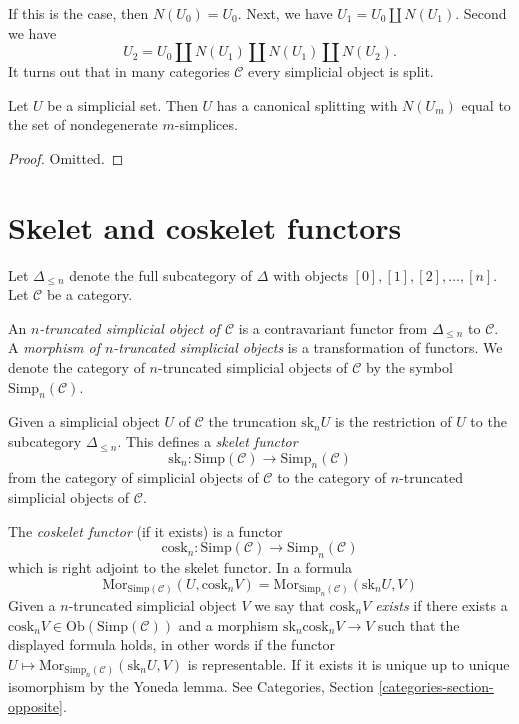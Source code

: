 \noindent
If this is the case, then $N(U_0) = U_0$. Next, we have
$U_1 = U_0 \coprod N(U_1)$. Second we have
$$
U_2 = U_0 \coprod N(U_1) \coprod N(U_1) \coprod N(U_2).
$$
It turns out that in many categories $\mathcal{C}$
every simplicial object is split.

\begin{lemma}
\label{lemma-splitting-simplicial-sets}
Let $U$ be a simplicial set.
Then $U$ has a canonical splitting
with $N(U_m)$ equal to the set of 
nondegenerate $m$-simplices.
\end{lemma}

\begin{proof}
Omitted.
\end{proof}

\section{Skelet and coskelet functors}
\label{section-skelet}

\noindent
Let $\Delta_{\leq n}$ denote the full subcategory of
$\Delta$ with objects $[0], [1], [2], \ldots, [n]$.
Let $\mathcal{C}$ be a category.

\begin{definition}
\label{definition-truncated-simplicial-object}
An {\it $n$-truncated simplicial object of $\mathcal{C}$} 
is a contravariant functor from $\Delta_{\leq n}$ to
$\mathcal{C}$. A {\it morphism of $n$-truncated
simplicial objects} is a transformation of functors.
We denote the category of $n$-truncated
simplicial objects of $\mathcal{C}$ by
the symbol $\text{Simp}_n(\mathcal{C})$.
\end{definition}

\noindent
Given a simplicial object $U$ of $\mathcal{C}$
the truncation $\text{sk}_n U$ is the restriction
of $U$ to the subcategory $\Delta_{\leq n}$.
This defines a {\it skelet functor}
$$
\text{sk}_n :
\text{Simp}(\mathcal{C}) \longrightarrow \text{Simp}_n(\mathcal{C})
$$
from the category of simplicial objects of $\mathcal{C}$
to the category of $n$-truncated simplicial objects of $\mathcal{C}$.

\medskip\noindent
The {\it coskelet functor} (if it exists) is a functor
$$
\text{cosk}_n :
\text{Simp}(\mathcal{C}) \longrightarrow \text{Simp}_n(\mathcal{C})
$$
which is right adjoint to the skelet functor. In a formula
\begin{equation}
\label{equation-cosk}
\text{Mor}_{\text{Simp}(\mathcal{C})}(U, \text{cosk}_n V)
=
\text{Mor}_{\text{Simp}_n(\mathcal{C})}(\text{sk}_n U, V)
\end{equation}
Given a $n$-truncated simplicial object $V$ we 
say that {\it $\text{cosk}_nV$ exists} if there
exists a $\text{cosk}_nV \in \text{Ob}(\text{Simp}(\mathcal{C}))$
and a morphism $\text{sk}_n \text{cosk}_n V \to V$
such that the displayed formula holds, in other words
if the functor
$U \mapsto \text{Mor}_{\text{Simp}_n(\mathcal{C})}(\text{sk}_n U, V)$
is representable. If it exists it
is unique up to unique isomorphism by the Yoneda lemma.
See Categories, Section \ref{categories-section-opposite}.

